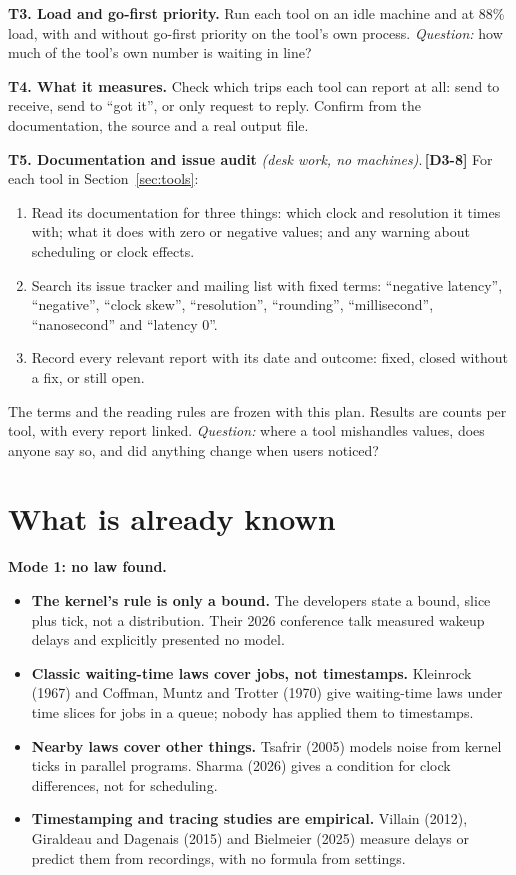 \documentclass[11pt]{article}
\newcommand{\gl}[1]{{\color{soft}\itshape\small (#1)}}
\newcommand{\chgold}[1]{\,{\color{oldcol}\bfseries\footnotesize[#1]}}
\begin{document}
\textbf{T3. Load and go-first priority.} Run each tool on an idle machine and at 88\% load, with and without go-first priority on the tool's own process. \emph{Question:} how much of the tool's own number is waiting in line?

\textbf{T4. What it measures.} Check which trips each tool can report at all: send to receive, send to ``got it'', or only request to reply. Confirm from the documentation, the source and a real output file.

\textbf{T5. Documentation and issue audit} \gl{desk work, no machines}.\chgold{D3-8} For each tool in Section~\ref{sec:tools}:
\begin{enumerate}
  \item Read its documentation for three things: which clock and resolution it times with; what it does with zero or negative values; and any warning about scheduling or clock effects.
  \item Search its issue tracker and mailing list with fixed terms: ``negative latency'', ``negative'', ``clock skew'', ``resolution'', ``rounding'', ``millisecond'', ``nanosecond'' and ``latency 0''.
  \item Record every relevant report with its date and outcome: fixed, closed without a fix, or still open.
\end{enumerate}
The terms and the reading rules are frozen with this plan. Results are counts per tool, with every report linked. \emph{Question:} where a tool mishandles values, does anyone say so, and did anything change when users noticed?

\section{What is already known}
\textbf{Mode 1: no law found.}
\begin{itemize}
  \item \textbf{The kernel's rule is only a bound.} The developers state a bound, slice plus tick, not a distribution. Their 2026 conference talk measured wakeup delays and explicitly presented no model.
  \item \textbf{Classic waiting-time laws cover jobs, not timestamps.} Kleinrock (1967) and Coffman, Muntz and Trotter (1970) give waiting-time laws under time slices for jobs in a queue; nobody has applied them to timestamps.
  \item \textbf{Nearby laws cover other things.} Tsafrir (2005) models noise from kernel ticks in parallel programs. Sharma (2026) gives a condition for clock differences, not for scheduling.
  \item \textbf{Timestamping and tracing studies are empirical.} Villain (2012), Giraldeau and Dagenais (2015) and Bielmeier (2025) measure delays or predict them from recordings, with no formula from settings.
\end{itemize}
\end{document}

